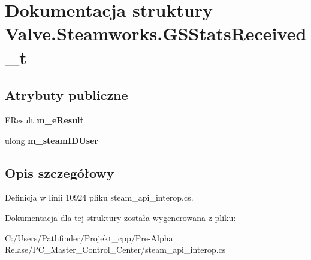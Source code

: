 \hypertarget{struct_valve_1_1_steamworks_1_1_g_s_stats_received__t}{}\section{Dokumentacja struktury Valve.\+Steamworks.\+G\+S\+Stats\+Received\+\_\+t}
\label{struct_valve_1_1_steamworks_1_1_g_s_stats_received__t}
\subsection*{Atrybuty publiczne}
\begin{DoxyCompactItemize}
\item 
\mbox{\label{struct_valve_1_1_steamworks_1_1_g_s_stats_received__t_a05c346e7ae8af0dbb851d61a61b4e88d}} 
E\+Result {\bfseries m\+\_\+e\+Result}
\item 
\mbox{\label{struct_valve_1_1_steamworks_1_1_g_s_stats_received__t_a0490ece5f004097a62258b1ab01f6323}} 
ulong {\bfseries m\+\_\+steam\+I\+D\+User}
\end{DoxyCompactItemize}


\subsection{Opis szczegółowy}


Definicja w linii 10924 pliku steam\+\_\+api\+\_\+interop.\+cs.



Dokumentacja dla tej struktury została wygenerowana z pliku\+:\begin{DoxyCompactItemize}
\item 
C\+:/\+Users/\+Pathfinder/\+Projekt\+\_\+cpp/\+Pre-\/\+Alpha Relase/\+P\+C\+\_\+\+Master\+\_\+\+Control\+\_\+\+Center/steam\+\_\+api\+\_\+interop.\+cs\end{DoxyCompactItemize}
